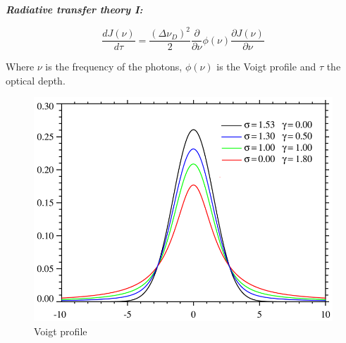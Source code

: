 \documentclass{beamer}
\begin{document}
\begin{frame}{\textit{\textbf{Radiative transfer theory I:}}}

\begin{equation}\label{eq:analytic}
\dfrac{d J(\nu)}{d\tau} = \dfrac{(\Delta \nu_D)^2}{2}\dfrac{\partial}{\partial \nu}\phi (\nu) \dfrac{\partial J(\nu)}{\partial \nu}
\end{equation}

Where $\nu$ is the frequency of the photons, $\phi(\nu)$ is the Voigt profile and $\tau$
the optical depth.

\begin{figure}
\includegraphics[scale=0.2]{Figures/voigt.png}
\caption{Voigt profile}
\end{figure}

\end{frame}
\end{document}
